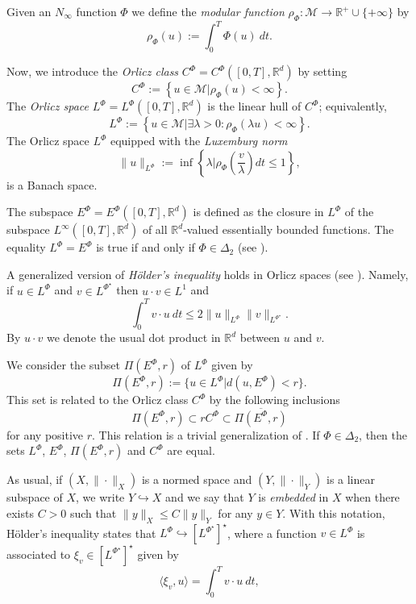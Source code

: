 \documentclass[twoside]{article}
\theoremstyle{remark}
\newcommand{\orlnor}{\|_{L^{\Phi}}}
\newcommand{\lphi}{L^{\Phi}}
\newcommand{\lpsi}{L^{\Phi^{\star}}}
\newcommand{\ephi}{E^{\Phi}}
\newcommand{\claseor}{C^{\Phi}}
\newcommand{\rr}{\mathbb{R}}
\renewcommand{\leq}{\leqslant}
\begin{document}
 Given  an $N_{\infty}$ function $\Phi$ we define the \emph{modular function} 
$\rho_{\Phi}:\mathcal{M}\to \mathbb{R}^+\cup\{+\infty\}$ by
\[\rho_{\Phi}(u):= \int_0^T \Phi(u)\ dt.\]

Now, we introduce the \emph{Orlicz class} $C^{\Phi}=C^{\Phi}\left([0,T],\rr^d\right)$   by setting
\begin{equation}\label{claseOrlicz}
  C^{\Phi}:=\left\{u\in \mathcal{M} | \rho_{\Phi}(u)< \infty \right\}.
\end{equation}
The \emph{Orlicz space} $\lphi=L^{\Phi}\left([0,T],\rr^d\right)$ is the linear hull of $\claseor$;
equivalently,
\begin{equation}\label{espacioOrlicz}
\lphi:=\left\{ u\in \mathcal{M}| \exists \lambda>0: \rho_{\Phi}(\lambda u) < \infty   \right\}.
\end{equation}
  The Orlicz space $\lphi$ equipped with the \emph{Luxemburg norm}
\[
\|  u  \orlnor:=\inf \left\{ \lambda\bigg| \rho_{\Phi}\left(\frac{v}{\lambda}\right) dt\leq 1\right\},
\]
is a Banach space. 


The subspace $\ephi=\ephi\left([0,T],\rr^d\right)$ is defined as the closure in $\lphi$ of the subspace $L^{\infty}\left([0,T],\rr^d\right)$ of all $\mathbb{R}^d$-valued essentially bounded functions. The equality $\lphi=\ephi$ is true if and only if $\Phi\in\Delta_2$ (see \cite[Cor. 5.1]{Orliczvectorial2005}). 

A generalized version of \emph{H\"older's inequality} holds in Orlicz spaces (see \cite[Thm. 7.2]{Orliczvectorial2005}). Namely, if $u\in\lphi$ and $v\in\lpsi$ then $u\cdot v\in L^1$ and
\begin{equation}\label{holder}
\int_0^Tv\cdot u\ dt\leq 2 \|u\orlnor\|v\|_{L^{\Phi^{\star}}}.
\end{equation}
By $u\cdot v$ we denote the usual dot product in $\mathbb{R}^{d}$ between $u$ and $v$.

We consider the subset $\Pi(\ephi,r)$ of $\lphi$ given by
\[\Pi(\ephi,r):=\{u\in\lphi| d(u,\ephi)<r\}.\]
This set is related to the Orlicz class $\claseor$ by the following inclusions
\begin{equation}\label{eq:inclusiones}\Pi(\ephi, r )\subset r \claseor\subset\overline{\Pi(\ephi,r)}
\end{equation}
for any positive $r$. This relation is a trivial generalization of  \cite[Thm. 5.6]{Orliczvectorial2005}.
If $\Phi \in \Delta_2$,  then the sets $\lphi$, $\ephi$, $\Pi(\ephi,r)$ and $\claseor$ are equal.
 
As usual, if $(X,\|\cdot\|_X)$ is a normed space and $(Y,\|\cdot \|_Y)$ is a linear subspace of $X$,  we write $Y\hookrightarrow X$ and we say that $Y$ is \emph{embedded} in $X$  when there exists $C>0$ such that
$\|y\|_X\leq C\|y\|_Y$ for any $y\in Y$.  With this notation, H\"older's inequality states that  $\lphi\hookrightarrow  \left[\lpsi\right]^\star$, where a function $v\in\lphi$ is associated  to $\xi_v\in \left[\lpsi\right]^\star$ given by
\begin{equation}\label{pairing}
  \langle \xi_v,u\rangle=\int_0^Tv\cdot u\ dt,
\end{equation}
\end{document}
